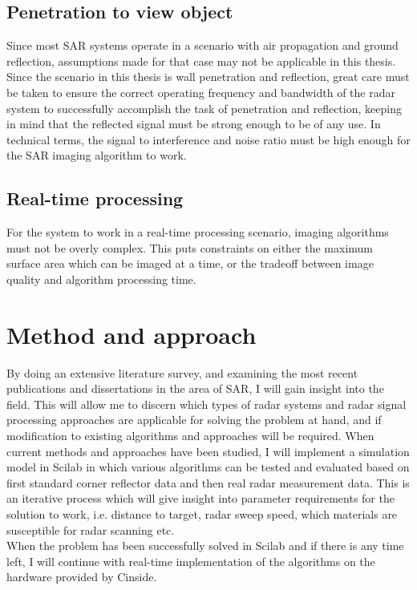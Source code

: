 \documentclass{chi2012}
\begin{document}
\subsection{Penetration to view object}
Since most SAR systems operate in a scenario with air propagation and ground reflection, assumptions made for that case may not be applicable in this thesis. Since the scenario in this thesis is wall penetration and reflection, great care must be taken to ensure the correct operating frequency and bandwidth of the radar system to successfully accomplish the task of penetration and reflection, keeping in mind that the reflected signal must be strong enough to be of any use. In technical terms, the signal to interference and noise ratio must be high enough for the SAR imaging algorithm to work.

\subsection{Real-time processing}
For the system to work in a real-time processing scenario, imaging algorithms must not be overly complex. This puts constraints on either the maximum surface area which can be imaged at a time, or the tradeoff between image quality and algorithm processing time.

\section{Method and approach}
By doing an extensive literature survey, and examining the most recent publications and dissertations in the area of SAR, I will gain insight into the field. This will allow me to discern which types of radar systems and radar signal processing approaches are applicable for solving the problem at hand, and if modification to existing algorithms and approaches will be required.
When current methods and approaches have been studied, I will implement a simulation model in Scilab\cite{scilab} in which various algorithms can be tested and evaluated based on first standard corner reflector data and then real radar measurement data. This is an iterative process which will give insight into parameter requirements for the solution to work, i.e. distance to target, radar sweep speed, which materials are susceptible for radar scanning etc.
\\
When the problem has been successfully solved in Scilab and if there is any time left, I will continue with real-time implementation of the algorithms on the hardware provided by Cinside.
\end{document}
